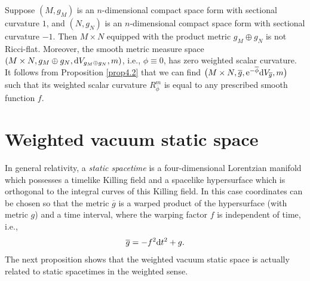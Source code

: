 \documentclass[pdftex]{sigma}
\numberwithin{equation}{section}
\begin{document}
Suppose $(M,g_M)$ is an $n$-dimensional compact space form with sectional curvature $1$,
and $(N,g_N)$ is an $n$-dimensional compact space form with sectional curvature $-1$.
Then $M\times N$ equipped with the product metric $g_M\oplus g_N$
is not Ricci-flat. Moreover,
the smooth metric measure space $(M\times N,g_M\oplus g_N,{\rm d}V_{g_M\oplus g_N},m)$, i.e., $\phi\equiv 0$,
has zero weighted scalar curvature. It follows from Proposition \ref{prop4.2} that
we can find
$\bigl(M\times N,\overline{g},{\rm e}^{-\overline{\phi}}{\rm d}V_{\overline{g}},m\bigr)$ such that
its weighted scalar curvature $R_{\overline{\phi}}^m$ is equal to any prescribed smooth function $f$.

\section{Weighted vacuum static space} \label{sec4}

In general relativity, a \textit{static spacetime} is a four-dimensional Lorentzian manifold which possesses a timelike Killing field and a spacelike hypersurface which is orthogonal to the integral curves of this Killing field. In this case coordinates can be chosen so that the metric $\overline{g}$ is a warped product of the hypersurface (with metric $g$) and a time interval, where the warping factor $f$ is independent of time, i.e.,
\begin{equation*}
 \overline{g}=-f^2{\rm d}t^2+g.
\end{equation*}
The next proposition shows that the weighted vacuum static space is actually related to static spacetimes in the weighted sense.
\end{document}
